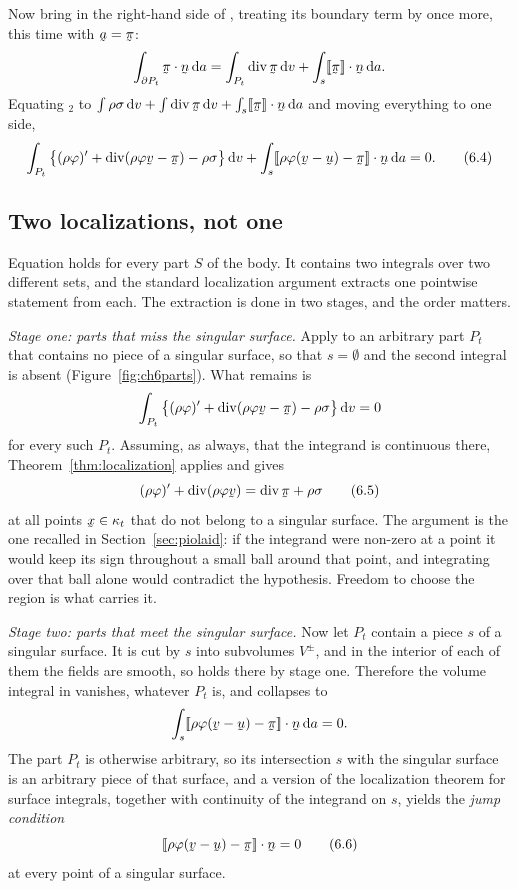Now bring in the right-hand side of , treating its boundary
term by  once more, this time with $\ba=\vek{\pi}$:
\[
   \int_{\partial P_{t}}\ip{\vek{\pi}}\bn\,\dl a
   =\int_{P_{t}}\dvg\vek{\pi}\,\dl v
   +\int_{s}\ip{\jump{\vek{\pi}}}\bn\,\dl a .
\]
Equating $_{2}$ to $\int\rho\sigma\,\dl v+\int\dvg\vek{\pi}\,
\dl v+\int_{s}\ip{\jump{\vek{\pi}}}\bn\,\dl a$ and moving everything to
one side,
\begin{equation}
   \int_{P_{t}}\big\{(\rho\varphi)'+\dvg(\rho\varphi\bv-\vek{\pi})
   -\rho\sigma\big\}\,\dl v
   +\int_{s}\ip{\jump{\rho\varphi(\bv-\bu)-\vek{\pi}}}\bn\,\dl a=0 .
   \tag{6.4}\label{eq:6.4}
\end{equation}

\subsection*{Two localizations, not one}

Equation  holds for every part $S$ of the body. It contains
two integrals over two different sets, and the standard localization
argument extracts one pointwise statement from each. The extraction is
done in two stages, and the order matters.

\emph{Stage one: parts that miss the singular surface.} Apply 
to an arbitrary part $P_{t}$ that contains no piece of a singular
surface, so that $s=\emptyset$ and the second integral is absent
(Figure~\ref{fig:ch6parts}). What remains is
\[
   \int_{P_{t}}\big\{(\rho\varphi)'+\dvg(\rho\varphi\bv-\vek{\pi})
   -\rho\sigma\big\}\,\dl v=0
\]
for every such $P_{t}$. Assuming, as always, that the integrand is
continuous there, Theorem~\ref{thm:localization} applies and gives
\begin{equation}
   (\rho\varphi)'+\dvg(\rho\varphi\bv)=\dvg\vek{\pi}+\rho\sigma
   \tag{6.5}\label{eq:6.5}
\end{equation}
at all points $\bx\in\kappa_{t}$ that do not belong to a singular
surface. The argument is the one recalled in Section~\ref{sec:piolaid}:
if the integrand were non-zero at a point it would keep its sign
throughout a small ball around that point, and integrating over that
ball alone would contradict the hypothesis. Freedom to choose the
region is what carries it.

\emph{Stage two: parts that meet the singular surface.} Now let
$P_{t}$ contain a piece $s$ of a singular surface. It is cut by $s$
into subvolumes $V^{\pm}$, and in the interior of each of them the
fields are smooth, so  holds there by stage one. Therefore the
volume integral in  vanishes, whatever $P_{t}$ is, and
 collapses to
\[
   \int_{s}\ip{\jump{\rho\varphi(\bv-\bu)-\vek{\pi}}}\bn\,\dl a=0 .
\]
The part $P_{t}$ is otherwise arbitrary, so its intersection $s$ with
the singular surface is an arbitrary piece of that surface, and a
version of the localization theorem for surface integrals, together
with continuity of the integrand on $s$, yields the \emph{jump
condition}
\begin{equation}
   \ip{\jump{\rho\varphi(\bv-\bu)-\vek{\pi}}}\bn=0
   \tag{6.6}\label{eq:6.6}
\end{equation}
at every point of a singular surface.

